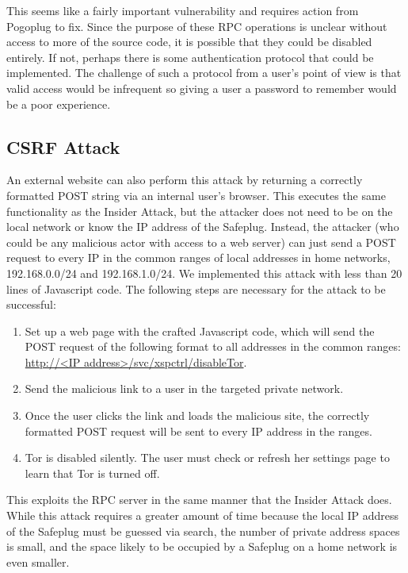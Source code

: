 \documentclass[conference]{IEEEtran}
\begin{document}
This seems like a fairly important vulnerability and requires action from Pogoplug to fix.  Since the purpose of these RPC operations is unclear without access to more of the source code, it is possible that they could be disabled entirely.  If not, perhaps there is some authentication protocol that could be implemented.  The challenge of such a protocol from a user's point of view is that valid access would be infrequent so giving a user a password to remember would be a poor experience.

\subsection{CSRF Attack}
An external website can also perform this attack by returning a correctly formatted POST string via an internal user's browser.  This executes the same functionality as the Insider Attack, but the attacker does not need to be on the local network or know the IP address of the Safeplug.  Instead, the attacker (who could be any malicious actor with access to a web server) can just send a POST request to every IP in the common ranges of local addresses in home networks, 192.168.0.0/24 and 192.168.1.0/24.  We implemented this attack with less than 20 lines of Javascript code.  The following steps are necessary for the attack to be successful:

\begin{enumerate}
\item Set up a web page with the crafted Javascript code, which will send the POST request of the following format to all addresses in the common ranges: \url{http://<IP address>/svc/xspctrl/disableTor}.
\item Send the malicious link to a user in the targeted private network.
\item Once the user clicks the link and loads the malicious site, the correctly formatted POST request will be sent to every IP address in the ranges.  
\item Tor is disabled silently.  The user must check or refresh her settings page to learn that Tor is turned off.  
\end{enumerate}  

This exploits the RPC server in the same manner that the Insider Attack does.  While this attack requires a greater amount of time because the local IP address of the Safeplug must be guessed via search, the number of private address spaces is small, and the space likely to be occupied by a Safeplug on a home network is even smaller.  
\end{document}
